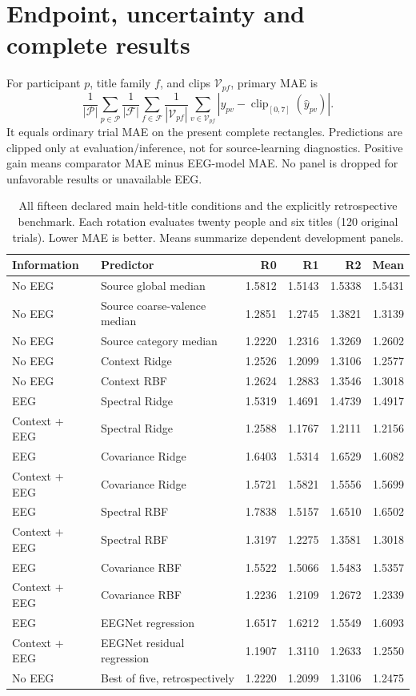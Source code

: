 \documentclass[11pt,a4paper]{article}
\newcommand{\clip}{\operatorname{clip}_{[0,7]}}
\begin{document}
\section{Endpoint, uncertainty and complete results}
For participant \(p\), title family \(f\), and clips \(\mathcal V_{pf}\), primary MAE is
\[
\frac1{|\mathcal P|}\sum_{p\in\mathcal P}
\frac1{|\mathcal F|}\sum_{f\in\mathcal F}
\frac1{|\mathcal V_{pf}|}\sum_{v\in\mathcal V_{pf}}
\left|y_{pv}-\clip(\widehat y_{pv})\right|.
\]
It equals ordinary trial MAE on the present complete rectangles. Predictions are clipped only at evaluation/inference, not for source-learning diagnostics. Positive gain means comparator MAE minus EEG-model MAE. No panel is dropped for unfavorable results or unavailable EEG.

\begin{table}[htbp]
\centering
\caption{All fifteen declared main held-title conditions and the explicitly retrospective benchmark. Each rotation evaluates twenty people and six titles (120 original trials). Lower MAE is better. Means summarize dependent development panels.}
\label{tab:all}
\footnotesize
\setlength{\tabcolsep}{4pt}
\begin{tabular}{@{}p{23mm}p{59mm}rrrr@{}}
\toprule
Information & Predictor & R0 & R1 & R2 & Mean\\
\midrule
No EEG & Source global median & 1.5812 & 1.5143 & 1.5338 & 1.5431\\
No EEG & Source coarse-valence median & 1.2851 & 1.2745 & 1.3821 & 1.3139\\
No EEG & Source category median & 1.2220 & 1.2316 & 1.3269 & 1.2602\\
No EEG & Context Ridge & 1.2526 & 1.2099 & 1.3106 & 1.2577\\
No EEG & Context RBF & 1.2624 & 1.2883 & 1.3546 & 1.3018\\
\midrule
EEG & Spectral Ridge & 1.5319 & 1.4691 & 1.4739 & 1.4917\\
Context + EEG & Spectral Ridge & 1.2588 & 1.1767 & 1.2111 & 1.2156\\
EEG & Covariance Ridge & 1.6403 & 1.5314 & 1.6529 & 1.6082\\
Context + EEG & Covariance Ridge & 1.5721 & 1.5821 & 1.5556 & 1.5699\\
EEG & Spectral RBF & 1.7838 & 1.5157 & 1.6510 & 1.6502\\
Context + EEG & Spectral RBF & 1.3197 & 1.2275 & 1.3581 & 1.3018\\
EEG & Covariance RBF & 1.5522 & 1.5066 & 1.5483 & 1.5357\\
Context + EEG & Covariance RBF & 1.2236 & 1.2109 & 1.2672 & 1.2339\\
EEG & EEGNet regression & 1.6517 & 1.6212 & 1.5549 & 1.6093\\
Context + EEG & EEGNet residual regression & 1.1907 & 1.3110 & 1.2633 & 1.2550\\
\midrule
No EEG & Best of five, retrospectively & 1.2220 & 1.2099 & 1.3106 & 1.2475\\
\bottomrule
\end{tabular}
\end{table}
\end{document}
